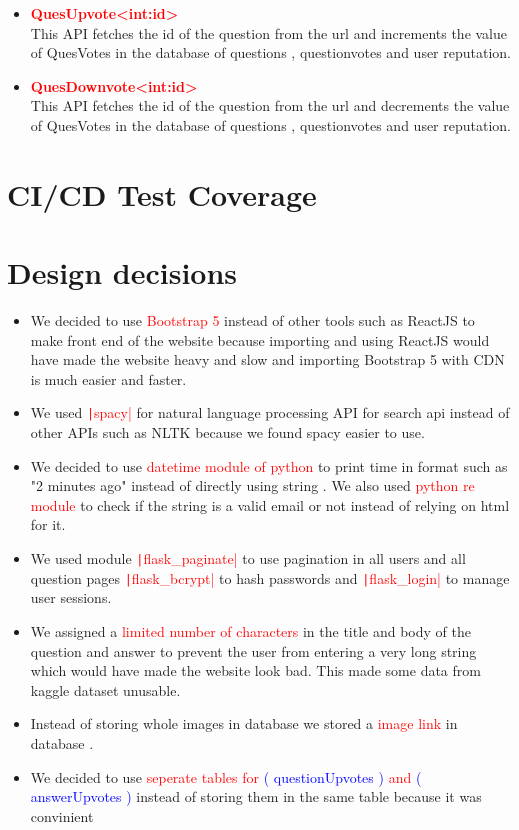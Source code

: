 \documentclass{article}
\begin{document}
\begin{itemize}
\begin{itemize}
        \item \textcolor{red}{\textbf{\textfractionsolidus QuesUpvote\textfractionsolidus \textless int:id\textgreater }} \\ This API fetches the id of the question from the url and increments the value of QuesVotes in the database of questions , questionvotes and user reputation.
        \item \textcolor{red}{\textbf{\textfractionsolidus QuesDownvote\textfractionsolidus \textless int:id\textgreater }} \\ This API fetches the id of the question from the url and decrements the value of QuesVotes in the database of questions , questionvotes and user reputation.
    \end{itemize}
    
    
\end{itemize}
\section{CI/CD Test Coverage}
\section{Design decisions}

\begin{itemize}
    \item We decided to use \textcolor{red}{Bootstrap 5} instead of other tools such as ReactJS to make front end of the website because importing and using ReactJS would have made the website heavy and slow and importing Bootstrap 5 with CDN is much easier and faster.
    \item We used  \textcolor{red}{\texttt|spacy|}  for natural language processing API for search api instead of other APIs such as NLTK because we found spacy easier to use.
    \item We decided to use \textcolor{red}{datetime module of python} to print time in format such as "2 minutes ago"  instead of directly using string . We also used \textcolor{red}{python re module} to check if the string is a valid email or not instead of relying on html for it.
    \item We used module \textcolor{red}{ \texttt|flask_paginate|} to use pagination in all users and all question pages   \textcolor{red}{\texttt|flask_bcrypt|} to hash passwords and \textcolor{red}{\texttt|flask_login|} to manage user sessions.
    \item We assigned a \textcolor{red}{limited number of characters} in the title and body of the question and answer to prevent the user from entering a very long string which would have made the website look bad. This made some data from kaggle dataset unusable.
    \item Instead of storing whole images in database we stored a \textcolor{red}{image link} in database .
    \item We decided to use \textcolor{red}{seperate tables for \textcolor{blue}{( questionUpvotes )} and \textcolor{blue}{( answerUpvotes )}} instead of storing them in the same table because it was convinient
\end{itemize}
\end{document}
